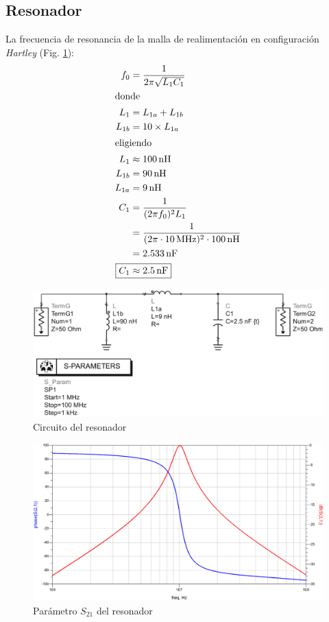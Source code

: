 \documentclass[journal]{IEEEtran}
\begin{document}
\subsection{Resonador}
La frecuencia de resonancia de la malla de realimentación en configuración \emph{Hartley} (Fig. \ref{fig:hartley_reso_sch}):
\begin{align*}
    f_0 &=\frac{1}{2\pi \sqrt{L_1 C_1}}\\
    \intertext{donde}
    L_1  &= L_{1a} + L_{1b}\\
    L_{1b} &= 10 \times L_{1a}\\
    \intertext{eligiendo}
    L_1     &\approx \SI{100}{\nano\henry}\\
    L_{1b}  &=\SI{90}{\nano\henry}\\
    L_{1a}  &=\SI{9}{\nano\henry}\\
    C_1 &= \frac{1}{(2\pi f_0)^2 L_1}\\
    &= \frac{1}{(2\pi \cdot \SI{10}{\mega\hertz})^2\cdot \SI{100}{\nano\henry}}\\
    &=\SI{2.533}{\nano\farad}\\
    \Aboxed{C_1 &\approx \SI{2.5}{\nano\farad}}
\end{align*}

\begin{figure}[H]
\centering
\includegraphics[width=1\linewidth]{capturas/hartley_reso_sch-cropped.pdf}
\caption{Circuito del resonador}
\label{fig:hartley_reso_sch}
\end{figure}

\begin{figure}[H]
\centering
\includegraphics[width=1\linewidth]{capturas/hartley_reso_bode-cropped.pdf}
\caption{Parámetro $S_{21}$ del resonador}
\label{fig:hartley_reso_s21}
\end{figure}
\end{document}
